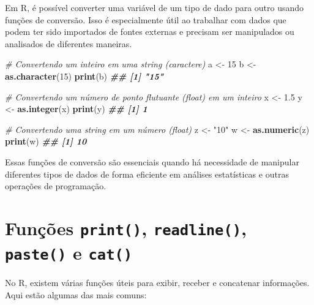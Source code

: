 \documentclass[
]{book}
\newenvironment{Shaded}{\begin{snugshade}}{\end{snugshade}}
\newcommand{\CommentTok}[1]{\textcolor[rgb]{0.56,0.35,0.01}{\textit{#1}}}
\newcommand{\DecValTok}[1]{\textcolor[rgb]{0.00,0.00,0.81}{#1}}
\newcommand{\DocumentationTok}[1]{\textcolor[rgb]{0.56,0.35,0.01}{\textbf{\textit{#1}}}}
\newcommand{\FloatTok}[1]{\textcolor[rgb]{0.00,0.00,0.81}{#1}}
\newcommand{\FunctionTok}[1]{\textcolor[rgb]{0.13,0.29,0.53}{\textbf{#1}}}
\newcommand{\NormalTok}[1]{#1}
\newcommand{\OtherTok}[1]{\textcolor[rgb]{0.56,0.35,0.01}{#1}}
\newcommand{\StringTok}[1]{\textcolor[rgb]{0.31,0.60,0.02}{#1}}
\begin{document}
Em R, é possível converter uma variável de um tipo de dado para outro
usando funções de conversão. Isso é especialmente útil ao trabalhar com
dados que podem ter sido importados de fontes externas e precisam ser
manipulados ou analisados de diferentes maneiras.

\begin{Shaded}
\begin{Highlighting}[]
\CommentTok{\# Convertendo um inteiro em uma string (caractere)}
\NormalTok{a }\OtherTok{\textless{}{-}} \DecValTok{15}
\NormalTok{b }\OtherTok{\textless{}{-}} \FunctionTok{as.character}\NormalTok{(}\DecValTok{15}\NormalTok{)}
\FunctionTok{print}\NormalTok{(b)}
\DocumentationTok{\#\# [1] "15"}
    
\CommentTok{\# Convertendo um número de ponto flutuante (float) em um inteiro}
\NormalTok{x }\OtherTok{\textless{}{-}} \FloatTok{1.5}
\NormalTok{y }\OtherTok{\textless{}{-}} \FunctionTok{as.integer}\NormalTok{(x)}
\FunctionTok{print}\NormalTok{(y)}
\DocumentationTok{\#\# [1] 1}

\CommentTok{\# Convertendo uma string em um número (float)}
\NormalTok{z }\OtherTok{\textless{}{-}} \StringTok{"10"}
\NormalTok{w }\OtherTok{\textless{}{-}} \FunctionTok{as.numeric}\NormalTok{(z)}
\FunctionTok{print}\NormalTok{(w)}
\DocumentationTok{\#\# [1] 10}
\end{Highlighting}
\end{Shaded}

Essas funções de conversão são essenciais quando há necessidade de
manipular diferentes tipos de dados de forma eficiente em análises
estatísticas e outras operações de programação.

\section{\texorpdfstring{Funções \texttt{print()}, \texttt{readline()}, \texttt{paste()} e \texttt{cat()}}{Funções print(), readline(), paste() e cat()}}\label{funuxe7uxf5es-print-readline-paste-e-cat}

No R, existem várias funções úteis para exibir, receber e concatenar
informações. Aqui estão algumas das mais comuns:
\end{document}
